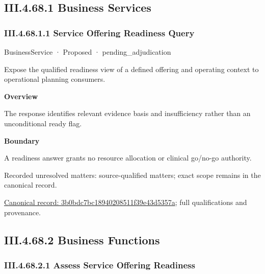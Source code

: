 \subsection*{III.4.68.1 Business Services}
\label{navigation:III.4.68.1}

\subsubsection*{III.4.68.1.1 Service Offering Readiness Query}
\label{navigation:III.4.68.1.1}

\label{element:3b0bdc7bc18940208511f39e43d5357a}
{\small BusinessService · Proposed · pending\_adjudication}\par

Expose the qualified readiness view of a defined offering and operating context to operational planning consumers.



\textbf{Overview}



The response identifies relevant evidence basis and insufficiency rather than an unconditional ready flag.



\textbf{Boundary}



A readiness answer grants no resource allocation or clinical go/no-go authority.


{\small Recorded unresolved matters: source-qualified matters; exact scope remains in the canonical record.}\par
{\footnotesize \href{../../../../continuum/business/business-service/3b0bdc7bc18940208511f39e43d5357a.md}{Canonical record: 3b0bdc7bc18940208511f39e43d5357a}; full qualifications and provenance.}\par
\subsection*{III.4.68.2 Business Functions}
\label{navigation:III.4.68.2}

\subsubsection*{III.4.68.2.1 Assess Service Offering Readiness}
\label{navigation:III.4.68.2.1}

